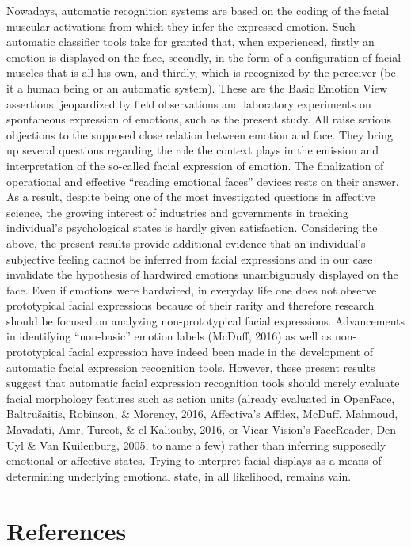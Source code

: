 \documentclass[man]{apa6}
\begin{document}
Nowadays, automatic recognition systems are based on the coding of the facial muscular activations from which they infer the expressed emotion. Such automatic classifier tools take for granted that, when experienced, firstly an emotion is displayed on the face, secondly, in the form of a configuration of facial muscles that is all his own, and thirdly, which is recognized by the perceiver (be it a human being or an automatic system). These are the Basic Emotion View assertions, jeopardized by field observations and laboratory experiments on spontaneous expression of emotions, such as the present study. All raise serious objections to the supposed close relation between emotion and face. They bring up several questions regarding the role the context plays in the emission and interpretation of the so-called facial expression of emotion. The finalization of operational and effective \enquote{reading emotional faces} devices rests on their answer. As a result, despite being one of the most investigated questions in affective science, the growing interest of industries and governments in tracking individual's psychological states is hardly given satisfaction. Considering the above, the present results provide additional evidence that an individual's subjective feeling cannot be inferred from facial expressions and in our case invalidate the hypothesis of hardwired emotions unambiguously displayed on the face. Even if emotions were hardwired, in everyday life one does not observe prototypical facial expressions because of their rarity and therefore research should be focused on analyzing non-prototypical facial expressions. Advancements in identifying \enquote{non-basic} emotion labels (McDuff, 2016) as well as non-prototypical facial expression have indeed been made in the development of automatic facial expression recognition tools. However, these present results suggest that automatic facial expression recognition tools should merely evaluate facial morphology features such as action units (already evaluated in OpenFace, Baltrušaitis, Robinson, \& Morency, 2016, Affectiva's Affdex, McDuff, Mahmoud, Mavadati, Amr, Turcot, \& el Kaliouby, 2016, or Vicar Vision's FaceReader, Den Uyl \& Van Kuilenburg, 2005, to name a few) rather than inferring supposedly emotional or affective states. Trying to interpret facial displays as a means of determining underlying emotional state, in all likelihood, remains vain.

\newpage

\hypertarget{references}{%
\section{References}\label{references}}
\end{document}
